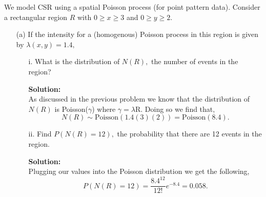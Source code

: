 \documentclass[12pt]{article}
\makeatletter
\theoremstyle{homework}
\newenvironment{exercise}[1]
{\def\@currentlabel{#1}\exercisecore}
{\endexercisecore}
\newcommand{\localhead}[1]{\par\smallskip\noindent\textbf{#1}\nobreak\\}%
\newcommand\solution{\localhead{Solution:}}
\makeatother
\begin{document}
\begin{exercise}{2} We model CSR using a spatial Poisson process (for point pattern data). Consider a rectangular region $R$
  with $0 \geq x \geq 3$ and $0 \geq y \geq 2$.\\
  \begin{enumerate}
    \item[(a)] If the intensity for a (homogenous) Poisson process in this region is given by $\lambda(x, y) = 1.4,$\\ 
    \begin{enumerate}
      \item[i.] What is the distribution of $N(R),$ the number of events in the region?\\
      \solution As discussed in the previous problem we know that the distribution of $N(R)$ is Poisson($\gamma$) where $\gamma = \lambda \text{R}$. Doing so we find that, 
      \begin{equation*}
        N(R) \sim \text{Poisson}(1.4(3)(2)) = \text{Poisson}(8.4). 
      \end{equation*}
      \vspace{.15in}
      \item[ii.] Find $P(N(R) = 12),$ the probability that there are 12 events in the region.\\
      \solution Plugging our values into the Poisson distribution we get the following, 
      \begin{equation*}
        P(N(R) = 12) = \dfrac{8.4^{12}}{12!}e^{-8.4} = 0.058.
      \end{equation*}
      \vspace{.15in}
    \end{enumerate} 


\end{enumerate}
\end{exercise}
\end{document}

